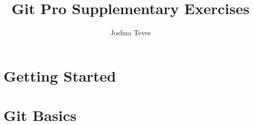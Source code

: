 \documentclass{book}
\title{Git Pro Supplementary Exercises}
\author{Joshua Teves}
\begin{document}
\maketitle

\chapter{Getting Started}


\chapter{Git Basics}

\end{document}

